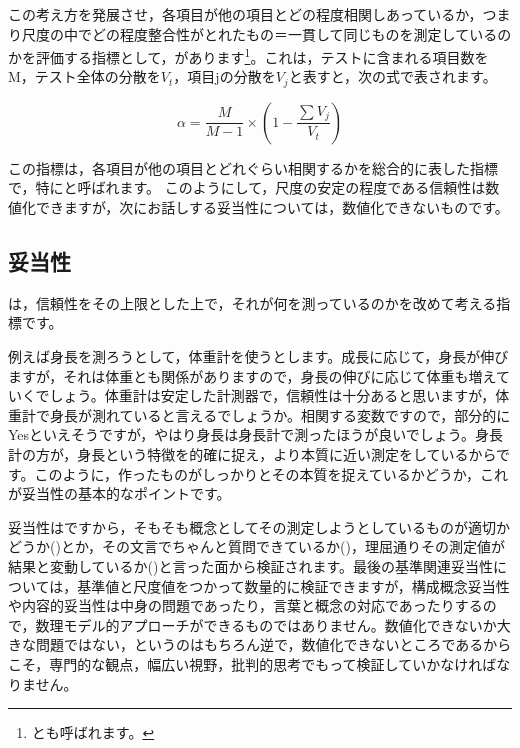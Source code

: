 \documentclass{ltjsbook}
\begin{document}
この考え方を発展させ，各項目が他の項目とどの程度相関しあっているか，つまり尺度の中でどの程度整合性がとれたもの＝一貫して同じものを測定しているのかを評価する指標として，があります\footnote{とも呼ばれます。}。これは，テストに含まれる項目数をM，テスト全体の分散を$V_t$，項目jの分散を$V_j$と表すと，次の式で表されます。

\[  \alpha =   \frac{M}{M-1} \times \left(1-\frac{\sum V_j}{V_t} \right) \]

この指標は，各項目が他の項目とどれぐらい相関するかを総合的に表した指標で，特にと呼ばれます。
このようにして，尺度の安定の程度である信頼性は数値化できますが，次にお話しする妥当性については，数値化できないものです。
\subsection{妥当性}
は，信頼性をその上限とした上で，それが何を測っているのかを改めて考える指標です。

例えば身長を測ろうとして，体重計を使うとします。成長に応じて，身長が伸びますが，それは体重とも関係がありますので，身長の伸びに応じて体重も増えていくでしょう。体重計は安定した計測器で，信頼性は十分あると思いますが，体重計で身長が測れていると言えるでしょうか。相関する変数ですので，部分的にYesといえそうですが，やはり身長は身長計で測ったほうが良いでしょう。身長計の方が，身長という特徴を的確に捉え，より本質に近い測定をしているからです。このように，作ったものがしっかりとその本質を捉えているかどうか，これが妥当性の基本的なポイントです。

妥当性はですから，そもそも概念としてその測定しようとしているものが適切かどうか()とか，その文言でちゃんと質問できているか()，理屈通りその測定値が結果と変動しているか()と言った面から検証されます。最後の基準関連妥当性については，基準値と尺度値をつかって数量的に検証できますが，構成概念妥当性や内容的妥当性は中身の問題であったり，言葉と概念の対応であったりするので，数理モデル的アプローチができるものではありません。数値化できないか大きな問題ではない，というのはもちろん逆で，数値化できないところであるからこそ，専門的な観点，幅広い視野，批判的思考でもって検証していかなければなりません。
\end{document}
